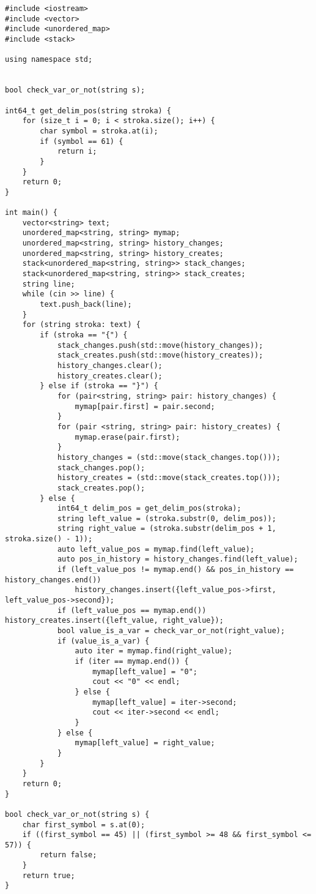 \begin{verbatim}
#include <iostream>
#include <vector>
#include <unordered_map>
#include <stack>

using namespace std;


bool check_var_or_not(string s);

int64_t get_delim_pos(string stroka) {
    for (size_t i = 0; i < stroka.size(); i++) {
        char symbol = stroka.at(i);
        if (symbol == 61) {
            return i;
        }
    }
    return 0;
}

int main() {
    vector<string> text;
    unordered_map<string, string> mymap;
    unordered_map<string, string> history_changes;
    unordered_map<string, string> history_creates;
    stack<unordered_map<string, string>> stack_changes;
    stack<unordered_map<string, string>> stack_creates;
    string line;
    while (cin >> line) {
        text.push_back(line);
    }
    for (string stroka: text) {
        if (stroka == "{") {
            stack_changes.push(std::move(history_changes));
            stack_creates.push(std::move(history_creates));
            history_changes.clear();
            history_creates.clear();
        } else if (stroka == "}") {
            for (pair<string, string> pair: history_changes) {
                mymap[pair.first] = pair.second;
            }
            for (pair <string, string> pair: history_creates) {
                mymap.erase(pair.first);
            }
            history_changes = (std::move(stack_changes.top()));
            stack_changes.pop();
            history_creates = (std::move(stack_creates.top()));
            stack_creates.pop();
        } else {
            int64_t delim_pos = get_delim_pos(stroka);
            string left_value = (stroka.substr(0, delim_pos));
            string right_value = (stroka.substr(delim_pos + 1, stroka.size() - 1));
            auto left_value_pos = mymap.find(left_value);
            auto pos_in_history = history_changes.find(left_value);
            if (left_value_pos != mymap.end() && pos_in_history == history_changes.end())
                history_changes.insert({left_value_pos->first, left_value_pos->second});
            if (left_value_pos == mymap.end()) history_creates.insert({left_value, right_value});
            bool value_is_a_var = check_var_or_not(right_value);
            if (value_is_a_var) {
                auto iter = mymap.find(right_value);
                if (iter == mymap.end()) {
                    mymap[left_value] = "0";
                    cout << "0" << endl;
                } else {
                    mymap[left_value] = iter->second;
                    cout << iter->second << endl;
                }
            } else {
                mymap[left_value] = right_value;
            }
        }
    }
    return 0;
}

bool check_var_or_not(string s) {
    char first_symbol = s.at(0);
    if ((first_symbol == 45) || (first_symbol >= 48 && first_symbol <= 57)) {
        return false;
    }
    return true;
}
\end{verbatim}
\normalsize
\BgThispage
\newpage

